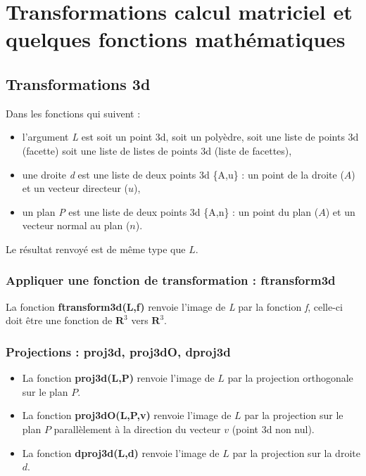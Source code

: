 \section{Transformations calcul matriciel et quelques fonctions mathématiques}

\subsection{Transformations 3d}

Dans les fonctions qui suivent :
\begin{itemize}
    \item l'argument \emph{L} est soit un point 3d, soit un polyèdre, soit une liste de points 3d (facette) soit une liste de listes de points 3d (liste de facettes),
    \item une droite \emph{d} est une liste de deux points 3d \{A,u\} : un point de la droite ($A$) et un vecteur directeur ($u$),
    \item un plan \emph{P} est une liste de deux points 3d \{A,n\} : un point du plan ($A$) et un vecteur normal au plan ($n$).
  \end{itemize}
Le résultat renvoyé est de même type que $L$.
  
\subsubsection{Appliquer une fonction de transformation : ftransform3d}

La fonction \textbf{ftransform3d(L,f)} renvoie l'image de \emph{L} par la fonction \emph{f}, celle-ci  doit être une fonction de $\mathbf R^3$ vers $\mathbf R^3$.

\subsubsection{Projections : proj3d, proj3dO, dproj3d}

\begin{itemize}
    \item La fonction \textbf{proj3d(L,P)} renvoie l'image de $L$ par la projection orthogonale sur le plan $P$.
    \item La fonction \textbf{proj3dO(L,P,v)} renvoie l'image de $L$ par la projection sur le plan $P$ parallèlement à la direction du vecteur $v$ (point 3d non nul).
    \item La fonction \textbf{dproj3d(L,d)} renvoie l'image de $L$ par la projection sur la droite $d$.
\end{itemize}

